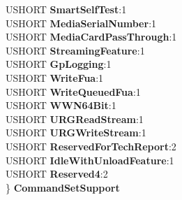 \begin{DoxyCompactItemize}
\begin{tabbing}
\>USHORT {\bfseries SmartSelfTest}:1\\
\>USHORT {\bfseries MediaSerialNumber}:1\\
\>USHORT {\bfseries MediaCardPassThrough}:1\\
\>USHORT {\bfseries StreamingFeature}:1\\
\>USHORT {\bfseries GpLogging}:1\\
\>USHORT {\bfseries WriteFua}:1\\
\>USHORT {\bfseries WriteQueuedFua}:1\\
\>USHORT {\bfseries WWN64Bit}:1\\
\>USHORT {\bfseries URGReadStream}:1\\
\>USHORT {\bfseries URGWriteStream}:1\\
\>USHORT {\bfseries ReservedForTechReport}:2\\
\>USHORT {\bfseries IdleWithUnloadFeature}:1\\
\>USHORT {\bfseries Reserved4}:2\\
\} {\bfseries CommandSetSupport}\\


\end{tabbing}
\end{DoxyCompactItemize}

